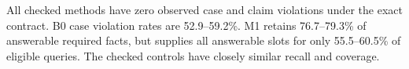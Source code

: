 All checked methods have zero observed case and claim violations under the exact contract. B0 case violation rates are 52.9--59.2\%. M1 retains 76.7--79.3\% of answerable required facts, but supplies all answerable slots for only 55.5--60.5\% of eligible queries. The checked controls have closely similar recall and coverage.
